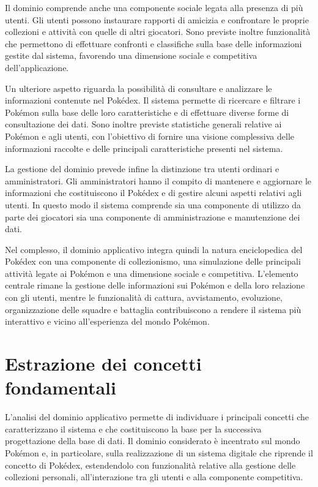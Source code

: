 \documentclass[a4paper,12pt]{report}
\begin{document}
\vspace{0,5 cm}
Il dominio comprende anche una componente sociale legata alla presenza di più utenti. Gli utenti possono instaurare rapporti di amicizia e confrontare le proprie collezioni e attività con quelle di altri giocatori. Sono previste inoltre funzionalità che permettono di effettuare confronti e classifiche sulla base delle informazioni gestite dal sistema, favorendo una dimensione sociale e competitiva dell'applicazione.

\vspace{0,5 cm}
Un ulteriore aspetto riguarda la possibilità di consultare e analizzare le informazioni contenute nel Pokédex. Il sistema permette di ricercare e filtrare i Pokémon sulla base delle loro caratteristiche e di effettuare diverse forme di consultazione dei dati. Sono inoltre previste statistiche generali relative ai Pokémon e agli utenti, con l'obiettivo di fornire una visione complessiva delle informazioni raccolte e delle principali caratteristiche presenti nel sistema.

\vspace{0,5 cm}
La gestione del dominio prevede infine la distinzione tra utenti ordinari e amministratori. Gli amministratori hanno il compito di mantenere e aggiornare le informazioni che costituiscono il Pokédex e di gestire alcuni aspetti relativi agli utenti. In questo modo il sistema comprende sia una componente di utilizzo da parte dei giocatori sia una componente di amministrazione e manutenzione dei dati.

\vspace{0,5 cm}
Nel complesso, il dominio applicativo integra quindi la natura enciclopedica del Pokédex con una componente di collezionismo, una simulazione delle principali attività legate ai Pokémon e una dimensione sociale e competitiva. L'elemento centrale rimane la gestione delle informazioni sui Pokémon e della loro relazione con gli utenti, mentre le funzionalità di cattura, avvistamento, evoluzione, organizzazione delle squadre e battaglia contribuiscono a rendere il sistema più interattivo e vicino all'esperienza del mondo Pokémon.

\section{Estrazione dei concetti fondamentali}

L'analisi del dominio applicativo permette di individuare i principali concetti che caratterizzano il sistema e che costituiscono la base per la successiva progettazione della base di dati. Il dominio considerato è incentrato sul mondo Pokémon e, in particolare, sulla realizzazione di un sistema digitale che riprende il concetto di Pokédex, estendendolo con funzionalità relative alla gestione delle collezioni personali, all'interazione tra gli utenti e alla componente competitiva.
\end{document}
